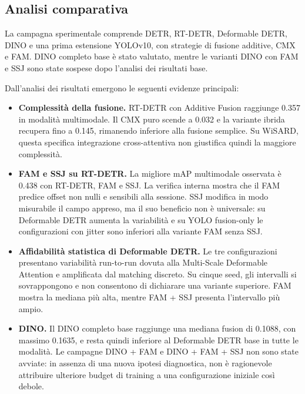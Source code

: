 \documentclass[a4paper,11pt]{article}
\begin{document}

\subsection{Analisi comparativa}

La campagna sperimentale comprende DETR, RT-DETR, Deformable DETR, DINO e una prima estensione YOLOv10, con strategie di fusione additive, CMX e FAM. DINO completo base è stato valutato, mentre le varianti DINO con FAM e SSJ sono state sospese dopo l'analisi dei risultati base.

Dall'analisi dei risultati emergono le seguenti evidenze principali:

\begin{itemize}
    \item \textbf{Complessità della fusione.}
    RT-DETR con Additive Fusion raggiunge 0.357 in modalità multimodale. Il CMX puro scende a 0.032 e la variante ibrida recupera fino a 0.145, rimanendo inferiore alla fusione semplice. Su WiSARD, questa specifica integrazione cross-attentiva non giustifica quindi la maggiore complessità.

    \item \textbf{FAM e SSJ su RT-DETR.}
    La migliore mAP multimodale osservata è 0.438 con RT-DETR, FAM e SSJ. La verifica interna mostra che il FAM predice offset non nulli e sensibili alla sessione. SSJ modifica in modo misurabile il campo appreso, ma il suo beneficio non è universale: su Deformable DETR aumenta la variabilità e su YOLO fusion-only le configurazioni con jitter sono inferiori alla variante FAM senza SSJ.

    \item \textbf{Affidabilità statistica di Deformable DETR.}
    Le tre configurazioni presentano variabilità run-to-run dovuta alla Multi-Scale Deformable Attention e amplificata dal matching discreto. Su cinque seed, gli intervalli si sovrappongono e non consentono di dichiarare una variante superiore. FAM mostra la mediana più alta, mentre FAM + SSJ presenta l'intervallo più ampio.

    \item \textbf{DINO.}
    Il DINO completo base raggiunge una mediana fusion di 0.1088, con massimo 0.1635, e resta quindi inferiore al Deformable DETR base in tutte le modalità. Le campagne DINO + FAM e DINO + FAM + SSJ non sono state avviate: in assenza di una nuova ipotesi diagnostica, non è ragionevole attribuire ulteriore budget di training a una configurazione iniziale così debole.


\end{itemize}
\end{document}
